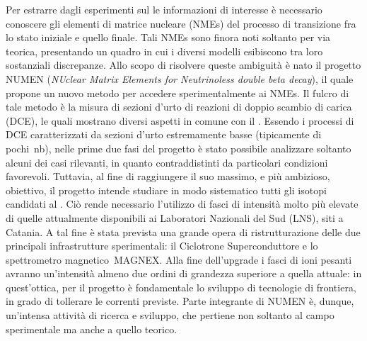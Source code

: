 Per estrarre dagli esperimenti sul \doppiobeta{} le informazioni di interesse è necessario conoscere gli elementi di matrice nucleare (NMEs) del processo di transizione fra lo stato iniziale e quello finale. 
Tali NMEs sono finora noti soltanto per via teorica, presentando un quadro in cui i diversi modelli esibiscono tra loro sostanziali discrepanze.
Allo scopo di risolvere queste ambiguità è nato il progetto NUMEN (\emph{NUclear Matrix Elements for Neutrinoless double beta decay}), il quale propone un nuovo metodo per accedere sperimentalmente ai NMEs.
Il fulcro di tale metodo è la misura di sezioni d'urto di reazioni di doppio scambio di carica (DCE), le quali mostrano diversi aspetti in comune con il \doppiobeta.
Essendo i processi di DCE caratterizzati da sezioni d'urto estremamente basse (tipicamente di pochi~nb), nelle prime due fasi del progetto è stato possibile analizzare soltanto alcuni dei casi rilevanti, in quanto contraddistinti da particolari condizioni favorevoli.
Tuttavia, al fine di raggiungere il suo massimo, e più ambizioso, obiettivo, il progetto intende studiare in modo sistematico tutti gli isotopi candidati al \doppiobeta{}.
Ciò rende necessario l'utilizzo di fasci di intensità molto più elevate di quelle attualmente disponibili ai Laboratori Nazionali del Sud (LNS), siti a Catania.
A tal fine è stata prevista una grande opera di ristrutturazione delle due principali infrastrutture sperimentali: il Ciclotrone Superconduttore e lo spettrometro magnetico~MAGNEX.
Alla fine dell'upgrade i fasci di ioni pesanti avranno un'intensità almeno due ordini di grandezza superiore a quella attuale: in quest'ottica, per il progetto è fondamentale lo sviluppo di tecnologie di frontiera, in grado di tollerare le correnti previste.
Parte integrante di NUMEN è, dunque, un'intensa attività di ricerca e sviluppo, che pertiene non soltanto al campo sperimentale ma anche a quello teorico.


